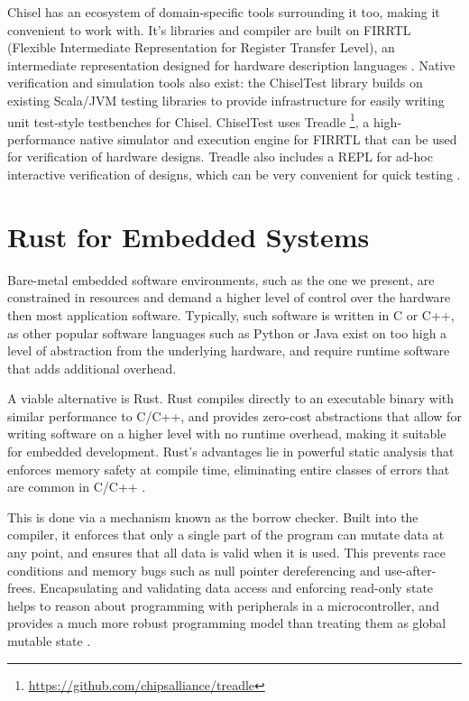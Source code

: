 Chisel has an ecosystem of domain-specific tools surrounding it too, making it convenient to work with. It's libraries and compiler are built on FIRRTL (Flexible Intermediate Representation for Register Transfer Level), an intermediate representation designed for hardware description languages \cite{firrtl}. Native verification and simulation tools also exist: the ChiselTest library builds on existing Scala/JVM testing libraries to provide infrastructure for easily writing unit test-style testbenches for Chisel. ChiselTest uses Treadle \footnote{\url{https://github.com/chipsalliance/treadle}}, a high-performance native simulator and execution engine for FIRRTL that can be used for verification of hardware designs. Treadle also includes a REPL for ad-hoc interactive verification of designs, which can be very convenient for quick testing \cite{chisel_site}.

\section{Rust for Embedded Systems}

Bare-metal embedded software environments, such as the one we present, are constrained in resources and demand a higher level of control over the hardware then most application software. Typically, such software is written in C or C++, as other popular software languages such as Python or Java exist on too high a level of abstraction from the underlying hardware, and require runtime software that adds additional overhead.

A viable alternative is Rust. Rust compiles directly to an executable binary with similar performance to C/C++, and provides zero-cost abstractions that allow for writing software on a higher level with no runtime overhead, making it suitable for embedded development. Rust's advantages lie in powerful static analysis that enforces memory safety at compile time, eliminating entire classes of errors that are common in C/C++ \cite{rust-paper}.

This is done via a mechanism known as the borrow checker. Built into the compiler, it enforces that only a single part of the program can mutate data at any point, and ensures that all data is valid when it is used. This prevents race conditions and memory bugs such as null pointer dereferencing and use-after-frees. Encapsulating and validating data access and enforcing read-only state helps to reason about programming with peripherals in a microcontroller, and provides a much more robust programming model than treating them as global mutable state \cite{rust-usability, rust-good}.

